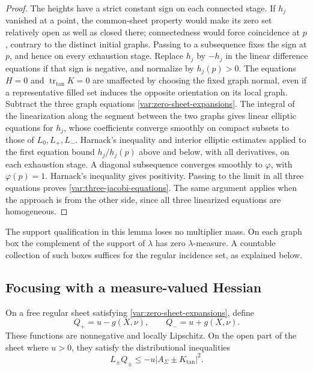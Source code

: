 \begin{proof}
The heights have a strict constant sign on each connected stage.
If $h_j$ vanished at a point, the common-sheet property would make
its zero set relatively open as well as closed there; connectedness
would force coincidence at $p$, contrary to the distinct initial
graphs.  Passing to a subsequence fixes the sign at $p$, and hence
on every exhaustion stage.  Replace $h_j$ by $-h_j$ in the linear
difference equations if that sign is negative, and normalize by
$h_j(p)>0$.  The equations $H=0$ and
$\operatorname{tr}_{\mathrm{tan}}K=0$ are unaffected by choosing
the fixed graph normal, even if a representative filled set induces
the opposite orientation on its local graph.
Subtract the three graph equations
\eqref{var:zero-sheet-expansions}.  The integral of the linearization
along the segment between the two graphs gives linear elliptic equations
for $h_j$, whose coefficients converge smoothly on compact subsets to
those of $L_0,L_+,L_-$.  Harnack's inequality and interior elliptic
estimates applied to the first equation bound $h_j/h_j(p)$ above and
below, with all derivatives, on each exhaustion stage.  A diagonal
subsequence converges smoothly to $\varphi$, with $\varphi(p)=1$.
Harnack's inequality gives positivity.  Passing to the limit in all
three equations proves \eqref{var:three-jacobi-equations}.  The same
argument applies when the approach is from the other side, since all
three linearized equations are homogeneous.
\end{proof}

The support qualification in this lemma loses no multiplier mass.  On
each graph box the complement of the support of $\lambda$ has zero
$\lambda$-measure.  A countable collection of such boxes suffices for
the regular incidence set, as explained below.

\subsection{Focusing with a measure-valued Hessian}

\begin{lemma}\label{var:weak-focusing}
On a free regular sheet satisfying
\eqref{var:zero-sheet-expansions}, define
\begin{equation}\label{var:Q-definitions}
 Q_+=u-g(X,\nu),\qquad Q_-=u+g(X,\nu).
\end{equation}
These functions are nonnegative and locally Lipschitz.  On the open part
of the sheet where $u>0$, they satisfy the distributional inequalities
\begin{equation}\label{var:weak-focusing-inequalities}
 L_\pm Q_\pm\leq -u|A_\Sigma\pm K_{\mathrm{tan}}|^2.
\end{equation}
\end{lemma}

